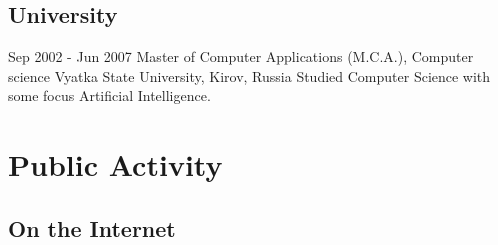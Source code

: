 \documentclass[11pt,a4paper]{moderncv}
\begin{document}
  \subsection{University}
  \cventry
    {Sep 2002 - Jun 2007}
    {Master of Computer Applications (M.C.A.), Computer science}
    {\newline Vyatka State University, Kirov, Russia}
    {}{}
    {Studied Computer Science with some focus Artificial Intelligence.}

\section{Public Activity}
  \subsection{On the Internet}
\end{document}
